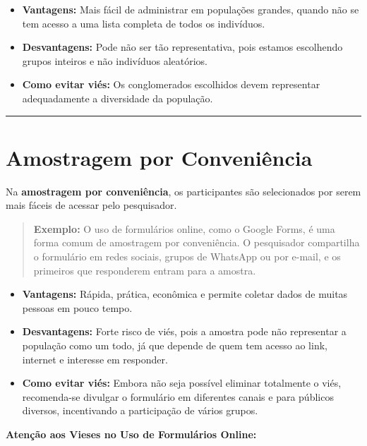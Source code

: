 \documentclass[
]{book}
\providecommand{\tightlist}{%
  \setlength{\itemsep}{0pt}\setlength{\parskip}{0pt}}
\begin{document}
\begin{itemize}
\tightlist
\item
  \textbf{Vantagens:} Mais fácil de administrar em populações grandes, quando não se tem acesso a uma lista completa de todos os indivíduos.
\item
  \textbf{Desvantagens:} Pode não ser tão representativa, pois estamos escolhendo grupos inteiros e não indivíduos aleatórios.
\item
  \textbf{Como evitar viés:} Os conglomerados escolhidos devem representar adequadamente a diversidade da população.
\end{itemize}

\begin{center}\rule{0.5\linewidth}{0.5pt}\end{center}

\section{Amostragem por Conveniência}\label{amostragem-por-conveniuxeancia}

Na \textbf{amostragem por conveniência}, os participantes são selecionados por serem mais fáceis de acessar pelo pesquisador.

\begin{quote}
\textbf{Exemplo:} O uso de formulários online, como o Google Forms, é uma forma comum de amostragem por conveniência. O pesquisador compartilha o formulário em redes sociais, grupos de WhatsApp ou por e-mail, e os primeiros que responderem entram para a amostra.
\end{quote}

\begin{itemize}
\tightlist
\item
  \textbf{Vantagens:} Rápida, prática, econômica e permite coletar dados de muitas pessoas em pouco tempo.
\item
  \textbf{Desvantagens:} Forte risco de viés, pois a amostra pode não representar a população como um todo, já que depende de quem tem acesso ao link, internet e interesse em responder.
\item
  \textbf{Como evitar viés:} Embora não seja possível eliminar totalmente o viés, recomenda-se divulgar o formulário em diferentes canais e para públicos diversos, incentivando a participação de vários grupos.
\end{itemize}

\textbf{Atenção aos Vieses no Uso de Formulários Online:}
\end{document}
